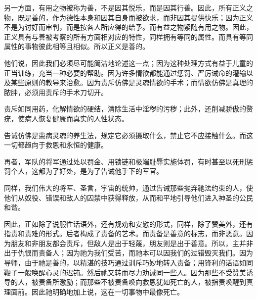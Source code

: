 另一方面，有用之物被称为善，不是因其悦乐，而是因其行善。因此，所有正义之物，既是善的，作为德性本身和因其自身而被欲求，而非因其提供快乐；因为正义不是为讨好而审判，而是按各人所应得的给予。而有益之物紧随有用之物。因此，正义具有与善被考察的所有方面相对应的特性，同样拥有等同的属性。而具有等同属性的事物彼此相等且相似。所以正义是善的。\par

他们说，因此我们必须尽可能简洁地论述这一点；因为这种处理方式有益于儿童的正当训练，充当一种必要的帮助。因为许多情欲都能通过惩罚、严厉诫命的灌输以及某些原则的教导来治愈。因为责斥仿佛是灵魂情欲的手术；而情欲仿佛是真理的脓肿，必须用责斥的手术刀切开。\par

责斥如同用药，化解情欲的硬结，清除生活中淫秽的污秽；此外，还削减骄傲的赘疣，使病人恢复健康而真实的人性状态。\par

告诫仿佛是患病灵魂的养生法，规定它必须摄取什么，禁止它不应接触什么。而这一切都趋向于救恩和永恒的健康。\par

再者，军队的将军通过处以罚金、用锁链和极端耻辱实施体罚，有时甚至以死刑惩罚个人，这都为了好处，是为了告诫他手下的军官。\par

同样，我们伟大的将军、圣言，宇宙的统帅，通过告诫那些抛弃祂法约束的人，使他们从奴役、错误和敌人的囚禁中获得释放，从而和平地引导他们进入神圣的公民和谐。\par

因此，正如除了说服性话语外，还有规劝和安慰的形式，同样，除了赞美外，还有指责和责难的形式。后者构成了责备的艺术。而责备是善意的标志，而非恶意。因为朋友和非朋友都会责斥，但敌人是出于轻蔑，朋友则是出于善意。所以，主并非出于仇恨而责备人；因为祂为我们受苦，而祂本可以因我们的过错毁灭我们。因为导师，由于祂是善的，以精湛的技巧通过训斥巧妙地转入责备；用锋利的话语如同鞭子一般唤醒心灵的迟钝。然后祂又转而尽力劝诫同一些人。因为那些不受赞美诱导的人，被责备所激励；而那些不被责备唤向救恩犹如死亡的人，被指责唤醒到真理面前。因此祂明确地加上说，这在一切事物中最像死亡。\par

